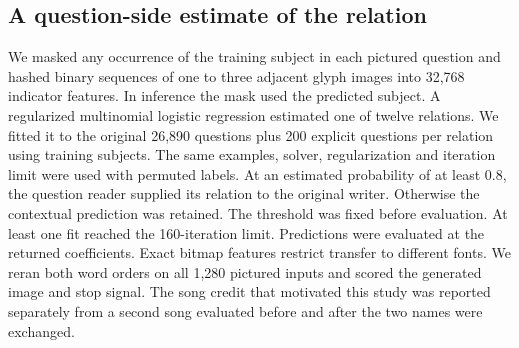 \subsection*{A question-side estimate of the relation}
We masked any occurrence of the training subject in each pictured question and hashed binary sequences of one to three adjacent glyph images into 32,768 indicator features. In inference the mask used the predicted subject. A regularized multinomial logistic regression estimated one of twelve relations. We fitted it to the original 26,890 questions plus 200 explicit questions per relation using training subjects. The same examples, solver, regularization and iteration limit were used with permuted labels. At an estimated probability of at least 0.8, the question reader supplied its relation to the original writer. Otherwise the contextual prediction was retained. The threshold was fixed before evaluation. At least one fit reached the 160-iteration limit. Predictions were evaluated at the returned coefficients. Exact bitmap features restrict transfer to different fonts. We reran both word orders on all 1,280 pictured inputs and scored the generated image and stop signal. The song credit that motivated this study was reported separately from a second song evaluated before and after the two names were exchanged.
